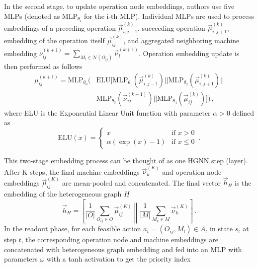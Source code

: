 In the second stage, to update operation node embeddings, authors use five MLPs (denoted as $\text{MLP}_{\theta_i}$ for the i-th MLP). Individual MLPs are used to process embeddings of a preceding operation $\vec{\mu}_{i,j-1}^{(k)}$, succeeding operation $\vec{\mu}_{i,j+1}^{(k)}$, embedding of the operation itself $\vec{\mu}_{ij}^{(k)}$, and aggregated neighboring machine embedding $\nu_{ij}^{(k+1)} = \sum_{M_l\in\mathcal{N}(O_{ij})} \vec{\nu}_l^{(k+1)}$. Operation embedding update is then performed as follows \cite{9826438}
\begin{equation}
    \begin{split}
        \mu_{ij}^{(k+1)}  = \text{MLP}_{\theta_0} \Bigg( 
            &\text{ELU} \Big[ 
                \text{MLP}_{\theta_1}\left(\vec{\mu}_{i,j-1}^{(k)}\right) || 
                \text{MLP}_{\theta_2}\left(\vec{\mu}_{i,j+1}^{(k)}\right) || \\
                &\text{MLP}_{\theta_3}\left(\vec{\nu}_{ij}^{(k+1)}\right) || 
                \text{MLP}_{\theta_4}\left(\vec{\mu}_{ij}^{(k)}\right)
            \Big]    
        \Bigg) \, ,
\end{split}
\end{equation}
where ELU is the Exponential Linear Unit function with parameter $\alpha > 0$ defined as \cite{elu_activation} 
\begin{equation}
    \text{ELU}(x) = \begin{cases} x & \mbox{if } x > 0 \\ \alpha (\exp(x) - 1) & \mbox{if } x \leq 0 \end{cases} \, .
\end{equation}
\par
This two-stage embedding process can be thought of as one HGNN step (layer). After K steps, the final machine embeddings $\vec{\nu}_k^{(K)}$ and operation node embeddings $\vec{\mu}_{ij}^{(K)}$ are mean-pooled and concatenated. The final vector $\vec{h}_H$ is the embedding of the heterogeneous graph $H$ \cite{9826438}
\begin{equation}
    \vec{h}_H = 
        \left [
            \frac{1}{|O|}\sum_{O_{ij} \in O} \vec{\mu}_{ij}^{(K)} 
            \middle\| 
            \frac{1}{|M|}\sum_{M_k \in M} \vec{\nu}_k^{(K)}
        \right ] \, .
\end{equation}
In the readout phase, for each feasible action $a_t = (O_{ij}, M_l) \in A_t$ in state $s_t$ at step $t$, the corresponding operation node and machine embeddings are concatenated with heterogeneous graph embedding and fed into an MLP with parameters $\omega$ with a tanh activation to get the priority index \cite{9826438}
